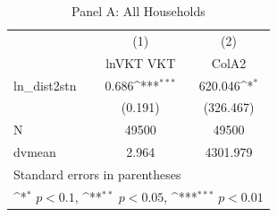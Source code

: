 \begin{table}[htbp]\centering
\def\sym#1{\ifmmode^{#1}\else\(^{#1}\)\fi}
\caption{Panel A: All Households}
\begin{tabular}{l*{2}{c}}
\hline\hline
            &\multicolumn{1}{c}{(1)}&\multicolumn{1}{c}{(2)}\\
            &\multicolumn{1}{c}{lnVKT VKT}&\multicolumn{1}{c}{ColA2}\\
\hline
ln\_dist2stn &       0.686\sym{***}&     620.046\sym{*}  \\
            &     (0.191)         &   (326.467)         \\
\hline
N           &       49500         &       49500         \\
dvmean      &       2.964         &    4301.979         \\
\hline\hline
\multicolumn{3}{l}{\footnotesize Standard errors in parentheses}\\
\multicolumn{3}{l}{\footnotesize \sym{*} \(p<0.1\), \sym{**} \(p<0.05\), \sym{***} \(p<0.01\)}\\
\end{tabular}
\end{table}

